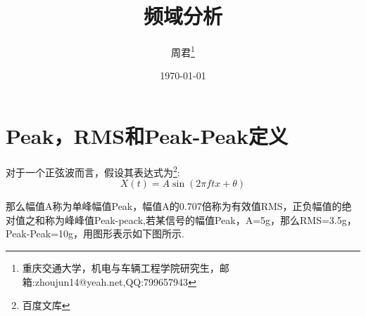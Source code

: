 \documentclass{article}
\title{\heiti \Large 频域分析}
\author{\songti 周君\footnote{重庆交通大学，机电与车辆工程学院研究生，邮箱:zhoujun14@yeah.net,QQ:799657943}}
\date{\today}
\begin{document}
	\maketitle %
	
	\section{Peak，RMS和Peak-Peak定义 }
	对于一个正弦波而言，假设其表达式为\footnote{百度文库}: %
	\begin{equation}
	X(t)=A\sin(2\pi ftx+\theta)
	\end{equation}
	\par 那么幅值A称为单峰幅值Peak，幅值A的0.707倍称为有效值RMS，正负幅值的绝对值之和称为峰峰值Peak-peack,若某信号的幅值Peak，A=5g，那么RMS=3.5g，Peak-Peak=10g，用图形表示如下图所示.
	
\end{document}
